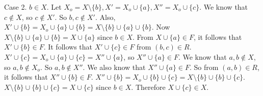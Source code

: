 \documentclass{article}
\begin{document}
Case 2. $b \in X$. Let $X_o = X \setminus \{b\}, X' = X_o \cup \{a\},
X'' = X_o \cup \{c\}$. We know that $c \notin X$, so $c \notin X'$. So
$b,c \notin X'$. Also, $X' \cup \{b\} = X_o \cup \{a\} \cup \{b\} = X
\setminus \{b\} \cup \{a\} \cup \{b\}$. Now $X \setminus \{b\} \cup
\{a\} \cup \{b\} = X \cup \{a\} $ since $b \in X$. From $X \cup \{a\}
\in F$, it follows that $X' \cup \{b\} \in F$. It follows that $X'
\cup \{c\} \in F$ from $(b,c) \in R$. $X' \cup \{c\} = X_o \cup \{a\}
\cup \{c\} = X'' \cup \{a\}$, so $X'' \cup \{a\} \in F$. We know that
$a,b \notin X$, so $a,b \notin X_o$. So $a,b \notin X''$. We also know
that $X'' \cup \{a\} \in F$. So from $(a,b) \in R$, it follows that
$X'' \cup \{b\} \in F$. $X'' \cup \{b\} = X_o \cup \{b\} \cup \{c\} =
X \setminus \{b\} \cup \{b\} \cup \{c\}$. $X \setminus \{b\} \cup
\{b\} \cup \{c\} = X \cup \{c\}$ since $b \in X$. Therefore $X \cup
\{c\} \in X$.
\end{document}

